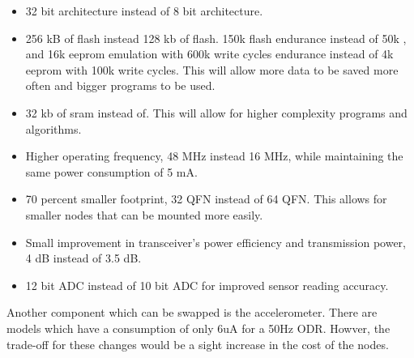 \begin{itemize}
    \item 32 bit architecture instead of 8 bit architecture.
    \item 256 kB of flash instead 128 kb of flash. 150k flash endurance instead of 50k , and 16k eeprom emulation with 600k write cycles endurance instead of 4k eeprom with 100k write cycles. This will allow more data to be saved more often and bigger programs to be used.
    \item 32 kb of sram instead of. This will allow for higher complexity programs and algorithms.
    \item Higher operating frequency, 48 MHz instead 16 MHz, while maintaining the same power consumption of 5 mA.
    \item 70 percent smaller footprint, 32 QFN instead of 64 QFN. This allows for smaller nodes that can be mounted more easily.
    \item Small improvement in transceiver's power efficiency and transmission power, 4 dB instead of 3.5 dB.
    \item 12 bit ADC instead of 10 bit ADC for improved sensor reading accuracy.
\end{itemize}

Another component which can be swapped is the accelerometer. There are models which have a consumption of only 6uA for a 50Hz ODR.
Howver, the trade-off for these changes would be a sight increase in the cost of the nodes.
